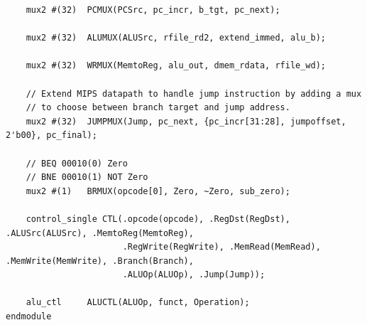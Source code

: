 \documentclass[12pt]{article}
\begin{document}
{\begin{verbatim}
    mux2 #(32)	PCMUX(PCSrc, pc_incr, b_tgt, pc_next);

    mux2 #(32) 	ALUMUX(ALUSrc, rfile_rd2, extend_immed, alu_b);

    mux2 #(32)	WRMUX(MemtoReg, alu_out, dmem_rdata, rfile_wd);

    // Extend MIPS datapath to handle jump instruction by adding a mux
    // to choose between branch target and jump address.
    mux2 #(32)  JUMPMUX(Jump, pc_next, {pc_incr[31:28], jumpoffset, 2'b00}, pc_final);

    // BEQ 00010(0) Zero
    // BNE 00010(1) NOT Zero
    mux2 #(1)   BRMUX(opcode[0], Zero, ~Zero, sub_zero);

    control_single CTL(.opcode(opcode), .RegDst(RegDst), .ALUSrc(ALUSrc), .MemtoReg(MemtoReg),
                       .RegWrite(RegWrite), .MemRead(MemRead), .MemWrite(MemWrite), .Branch(Branch),
                       .ALUOp(ALUOp), .Jump(Jump));

    alu_ctl 	ALUCTL(ALUOp, funct, Operation);
endmodule
\end{verbatim}
}
\end{document}
